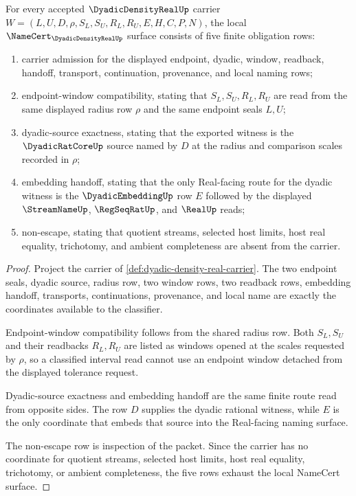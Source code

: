 \begin{theorem}
\label{thm:dyadic-density-real-namecert-obligations}
For every accepted $\DyadicDensityRealUp$ carrier
$W=(L,U,D,\rho,S_L,S_U,R_L,R_U,E,H,C,P,N)$, the local
$\NameCert_{\DyadicDensityRealUp}$ surface consists of five finite obligation
rows:
\begin{enumerate}
\item carrier admission for the displayed endpoint, dyadic, window, readback,
handoff, transport, continuation, provenance, and local naming rows;
\item endpoint-window compatibility, stating that $S_L,S_U,R_L,R_U$ are read
from the same displayed radius row $\rho$ and the same endpoint seals $L,U$;
\item dyadic-source exactness, stating that the exported witness is the
$\DyadicRatCoreUp$ source named by $D$ at the radius and comparison scales
recorded in $\rho$;
\item embedding handoff, stating that the only Real-facing route for the
dyadic witness is the $\DyadicEmbeddingUp$ row $E$ followed by the displayed
$\StreamNameUp$, $\RegSeqRatUp$, and $\RealUp$ reads;
\item non-escape, stating that quotient streams, selected host limits, host
real equality, trichotomy, and ambient completeness are absent from the
carrier.
\end{enumerate}
\end{theorem}
\begin{proof}
Project the carrier of \autoref{def:dyadic-density-real-carrier}. The two
endpoint seals, dyadic source, radius row, two window rows, two readback rows,
embedding handoff, transports, continuations, provenance, and local name are
exactly the coordinates available to the classifier.

Endpoint-window compatibility follows from the shared radius row. Both
$S_L,S_U$ and their readbacks $R_L,R_U$ are listed as windows opened at the
scales requested by $\rho$, so a classified interval read cannot use an
endpoint window detached from the displayed tolerance request.

Dyadic-source exactness and embedding handoff are the same finite route read
from opposite sides. The row $D$ supplies the dyadic rational witness, while
$E$ is the only coordinate that embeds that source into the Real-facing naming
surface.

The non-escape row is inspection of the packet. Since the carrier has no
coordinate for quotient streams, selected host limits, host real equality,
trichotomy, or ambient completeness, the five rows exhaust the local
NameCert surface.
\end{proof}


